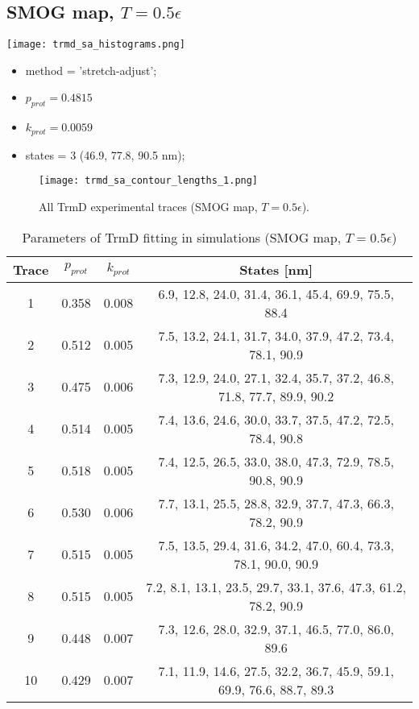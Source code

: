 \subsection{SMOG map, $T=0.5\epsilon$}
\label{subsec:trmd-sa}
\begin{minipage}[c]{0.7\textwidth}
    \texttt{[image: trmd\_sa\_histograms.png]}
\end{minipage}
\hfill
\begin{minipage}[c]{0.45\textwidth}
    \begin{itemize}
        \item method = 'stretch-adjust';
        \item $p_{prot}=0.4815$
        \item $k_{prot}=0.0059$
        \item states = 3 (46.9, 77.8, 90.5 nm);
    \end{itemize}
\end{minipage}

\begin{figure}
    \centering
    \texttt{[image: trmd\_sa\_contour\_lengths\_1.png]}
    \caption{All TrmD experimental traces (SMOG map, $T=0.5\epsilon$).}
    \label{fig:trmd-sa-cl1}
\end{figure}

\begin{table}
    \tiny
    \centering
    \caption{Parameters of TrmD fitting in simulations (SMOG map, $T=0.5\epsilon$)}
    \label{tab:trmd-sa-parameters}
    \begin{tabular}{c|c|c|c}
        \textbf{Trace} & \textbf{$p_{prot}$} & \textbf{$k_{prot}$} & \textbf{States [nm]}\\\hline
        1 & 0.358 & 0.008 & 6.9, 12.8, 24.0, 31.4, 36.1, 45.4, 69.9, 75.5, 88.4\\
        2 & 0.512 & 0.005 & 7.5, 13.2, 24.1, 31.7, 34.0, 37.9, 47.2, 73.4, 78.1, 90.9\\
        3 & 0.475 & 0.006 & 7.3, 12.9, 24.0, 27.1, 32.4, 35.7, 37.2, 46.8, 71.8, 77.7, 89.9, 90.2\\
        4 & 0.514 & 0.005 & 7.4, 13.6, 24.6, 30.0, 33.7, 37.5, 47.2, 72.5, 78.4, 90.8\\
        5 & 0.518 & 0.005 & 7.4, 12.5, 26.5, 33.0, 38.0, 47.3, 72.9, 78.5, 90.8, 90.9\\
        6 & 0.530 & 0.006 & 7.7, 13.1, 25.5, 28.8, 32.9, 37.7, 47.3, 66.3, 78.2, 90.9\\
        7 & 0.515 & 0.005 & 7.5, 13.5, 29.4, 31.6, 34.2, 47.0, 60.4, 73.3, 78.1, 90.0, 90.9\\
        8 & 0.515 & 0.005 & 7.2, 8.1, 13.1, 23.5, 29.7, 33.1, 37.6, 47.3, 61.2, 78.2, 90.9\\
        9 & 0.448 & 0.007 & 7.3, 12.6, 28.0, 32.9, 37.1, 46.5, 77.0, 86.0, 89.6\\
        10 & 0.429 & 0.007 & 7.1, 11.9, 14.6, 27.5, 32.2, 36.7, 45.9, 59.1, 69.9, 76.6, 88.7, 89.3\\\hline
    \end{tabular}
\end{table}


